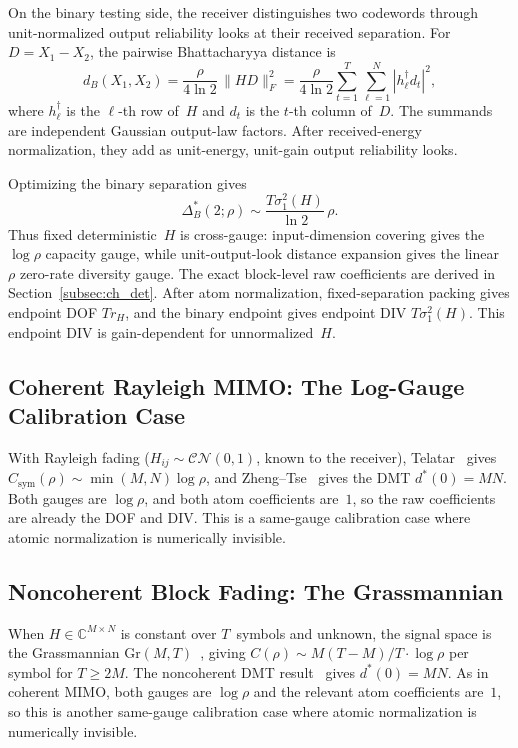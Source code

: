 \documentclass[lettersize,onecolumn]{IEEEtran}
\newcommand{\C}{\mathbb{C}}
\newcommand{\snr}{\rho}
\begin{document}
On the binary testing side, the receiver distinguishes two codewords
through unit-normalized output reliability looks at their received
separation. For $D = X_1 - X_2$, the pairwise Bhattacharyya distance
is
\[
  d_B(X_1, X_2) = \frac{\snr}{4\ln 2}\,\|HD\|_F^2
  = \frac{\snr}{4\ln 2}\sum_{t=1}^{T}\sum_{\ell=1}^{N}
    |h_\ell^\dagger d_t|^2,
\]
where $h_\ell^\dagger$ is the $\ell$-th row of~$H$ and $d_t$ is the
$t$-th column of~$D$. The summands are independent Gaussian output-law factors. After
received-energy normalization, they add as unit-energy, unit-gain
output reliability looks.

Optimizing the binary separation gives
\[
  \Delta_B^*(2;\snr) \sim \frac{T\sigma_1^2(H)}{\ln 2}\,\snr.
\]
Thus fixed deterministic~$H$ is cross-gauge: input-dimension covering
gives the $\log\snr$ capacity gauge, while unit-output-look distance expansion gives the linear~$\snr$
zero-rate diversity gauge. The
exact block-level raw coefficients are derived in
Section~\ref{subsec:ch_det}. After atom normalization,
fixed-separation packing gives endpoint DOF $Tr_H$, and the binary
endpoint gives endpoint DIV $T\sigma_1^2(H)$. This endpoint DIV is
gain-dependent for unnormalized~$H$.

\subsection{Coherent Rayleigh MIMO: The Log-Gauge Calibration Case}
\label{subsec:int_coh}

With Rayleigh fading ($H_{ij}\sim\mathcal{CN}(0,1)$, known to the
receiver), Telatar~\cite{Telatar1999} gives
$C_{\mathrm{sym}}(\snr) \sim \min(M,N)\log\snr$, and
Zheng--Tse~\cite{ZhengTse2003} gives the DMT $d^*(0) = MN$. Both
gauges are $\log\snr$, and both atom coefficients are~$1$, so the raw
coefficients are already the DOF and DIV\@. This is a same-gauge
calibration case where atomic normalization is numerically invisible.

\subsection{Noncoherent Block Fading: The Grassmannian}
\label{subsec:int_block}

When $H\in\C^{M\times N}$ is constant over $T$~symbols and unknown,
the signal space is the Grassmannian
$\mathrm{Gr}(M,T)$~\cite{ZhengTse2002}, giving
$C(\snr) \sim M(T-M)/T\cdot\log\snr$ per symbol for $T \ge 2M$.
The noncoherent DMT
result~\cite{ZhengTse2002Allerton} gives
$d^*(0) = MN$. As in coherent MIMO, both gauges are $\log\snr$ and
the relevant atom coefficients are~$1$, so this is another same-gauge
calibration case where atomic normalization is numerically invisible.
\end{document}
